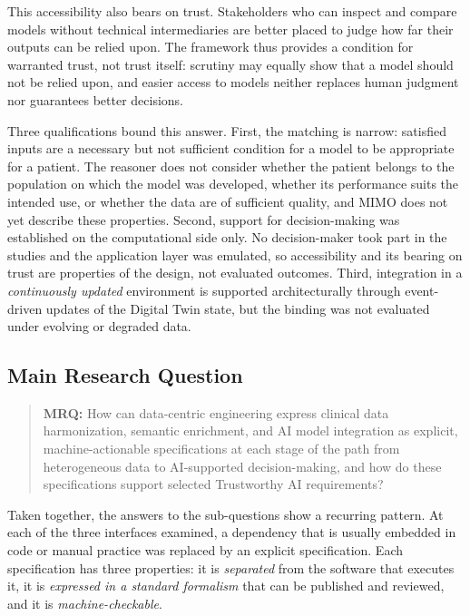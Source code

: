 This accessibility also bears on trust. Stakeholders who can inspect and compare models without technical intermediaries are better placed to judge how far their outputs can be relied upon. The framework thus provides a condition for warranted trust, not trust itself: scrutiny may equally show that a model should not be relied upon, and easier access to models neither replaces human judgment nor guarantees better decisions.

Three qualifications bound this answer. First, the matching is narrow: satisfied inputs are a necessary but not sufficient condition for a model to be appropriate for a patient. The reasoner does not consider whether the patient belongs to the population on which the model was developed, whether its performance suits the intended use, or whether the data are of sufficient quality, and MIMO does not yet describe these properties. Second, support for decision-making was established on the computational side only. No decision-maker took part in the studies and the application layer was emulated, so accessibility and its bearing on trust are properties of the design, not evaluated outcomes. Third, integration in a \emph{continuously updated} environment is supported architecturally through event-driven updates of the Digital Twin state, but the binding was not evaluated under evolving or degraded data.

\subsection{Main Research Question}
\label{subsec:conclusions_mrq}

\begin{quote}
\textbf{MRQ:} How can data-centric engineering express clinical data harmonization, semantic enrichment, and AI model integration as explicit, machine-actionable specifications at each stage of the path from heterogeneous data to AI-supported decision-making, and how do these specifications support selected Trustworthy AI requirements?
\end{quote}

Taken together, the answers to the sub-questions show a recurring pattern. At each of the three interfaces examined, a dependency that is usually embedded in code or manual practice was replaced by an explicit specification. Each specification has three properties: it is \emph{separated} from the software that executes it, it is \emph{expressed in a standard formalism} that can be published and reviewed, and it is \emph{machine-checkable}.


